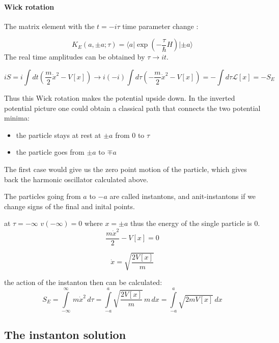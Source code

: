 \documentclass[12pt,a4paper]{article}
\newcommand{\ket}[1]{{ |#1 \rangle}}
\newcommand{\bra}[1]{{\langle#1|}}
\numberwithin{equation}{section}
\begin{document}
\paragraph{Wick rotation} The matrix element with the $t = -i\tau$ time parameter change :

\begin{equation}
K_E (a,\pm a; \tau) = \bra{a} \exp\left( -\frac{\tau}{\hbar} H \right) \ket{\pm a}
\end{equation}
The real time amplitudes can be obtained by $\tau \rightarrow it$.

\begin{equation}
iS = i\int dt \left( \frac{m}{2}\dot{x}^2 - V[x]  \right) \rightarrow i (-i)\int d\tau \left( -\frac{m}{2}\dot{x}^2 - V[x]  \right) = -\int d\tau \mathcal{L}[x] = -S_E
\end{equation}

Thus this Wick rotation makes the potential upside down. In the inverted potential picture one could obtain a classical path that connects the two potential minima:
\begin{itemize}
\item the particle stays at rest at $\pm a$ from 0 to $\tau$
\item the particle goes from $\pm a$ to $\mp a$
\end{itemize}

The first case would give us the zero point motion of the particle, which gives back the harmonic oscillator calculated above.

The particles going from $a$ to $-a$ are called instantons, and anit-instantons if we change signs of the final and inital points.

at $\tau = - \infty$ $v(-\infty) = 0$ where $x=\pm a$ thus the energy of the single particle is 0.
\begin{equation}
\frac{m\dot{x}^2}{2} - V[x] = 0
\end{equation}

\begin{equation}
\dot{x} = \sqrt{\frac{2V[x]}{m}}
\end{equation}

the action of the instanton then can be calculated:
\begin{equation}
S_E = \int\limits_{-\infty}^\infty \, m \dot{x}^2\,d\tau = \int \limits_{-a}^a \sqrt{\frac{2V[x]}{m}}\,m\, dx = \int \limits_{-a}^a \sqrt{{2mV[x]}}\, dx
\end{equation}

\subsection{The instanton solution}
\end{document}

